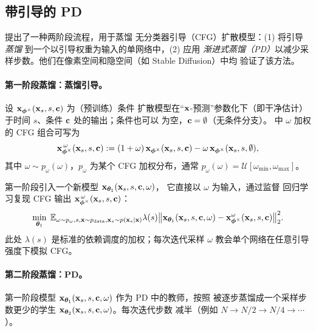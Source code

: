 


\subsection{带引导的 PD}\label{subsec:pd-guidance}
\citet{meng2023distillation} 提出了一种两阶段流程，用于蒸馏
无分类器引导（CFG）扩散模型：(1) 将引导\emph{蒸馏}
到一个以引导权重为输入的单网络中，(2) 应用
\emph{渐进式蒸馏（PD）}以减少采样步数。他们在像素空间和隐空间（如 Stable Diffusion）中均
验证了该方法。

\paragraph{第一阶段蒸馏：蒸馏引导。}
设 ${\mathbf{x}}_{\bm{\phi}^\times}({\mathbf{x}}_s, s, {\mathbf{c}})$ 为（预训练）条件
扩散模型在“${\mathbf{x}}$-预测”参数化下（即干净估计）于时间 $s$、条件 ${\mathbf{c}}$ 处的输出；条件也可以
为空，${\mathbf{c}}=\emptyset$（无条件分支）。 中 $\omega$ 加权的 CFG
组合可写为
\begin{equation}\label{eq:cfg-model-clean}
   {\mathbf{x}}_{\bm{\phi}^\times}^{\,\omega}({\mathbf{x}}_s, s, {\mathbf{c}})
   := (1+\omega)\,{\mathbf{x}}_{\bm{\phi}^\times}({\mathbf{x}}_s, s, {\mathbf{c}})
      - \omega\,{\mathbf{x}}_{\bm{\phi}^\times}({\mathbf{x}}_s, s, \emptyset),
\end{equation}
其中 $\omega \sim p_\omega(\omega)$，$p_\omega$ 为某个 CFG 加权分布，通常 $p_\omega(\omega)=\mathcal{U}[\omega_{\min},\omega_{\max}]$。

第一阶段引入一个新模型 ${\mathbf{x}}_{\bm{\theta}_1}({\mathbf{x}}_s, s, {\mathbf{c}}, \omega)$，
它直接以 $\omega$ 为输入，通过监督
回归学习复现 CFG 输出 ${\mathbf{x}}_{\bm{\phi}^\times}^{\,\omega}({\mathbf{x}}_s, s, {\mathbf{c}})$：
\[
\min_{\bm{\theta}_1}\;
\mathbb{E}_{\omega\sim p_\omega, s, {\mathbf{x}}\sim p_{\mathrm{data}}, {\mathbf{x}}_s \sim p({\mathbf{x}}_s\mid {\mathbf{x}})}
\lambda(s)
\big\|{\mathbf{x}}_{\bm{\theta}_1}({\mathbf{x}}_s, s, {\mathbf{c}}, \omega)-{\mathbf{x}}_{\bm{\phi}^\times}^{\omega}({\mathbf{x}}_s, s, {\mathbf{c}})\big\|_2^2.
\]
此处 $\lambda(s)$ 是标准的依赖调度的加权；每次迭代采样 $\omega$
教会单个网络在任意引导强度下模拟 CFG。

\paragraph{第二阶段蒸馏：PD。}
第一阶段模型 ${\mathbf{x}}_{\bm{\theta}_1}({\mathbf{x}}_s, s, {\mathbf{c}}, \omega)$ 作为
PD 中的教师，按照  被逐步蒸馏成一个采样步数更少的学生
${\mathbf{x}}_{\bm{\theta}_2}({\mathbf{x}}_s, s, {\mathbf{c}}, \omega)$。每次迭代步数
减半（例如 $N \to N/2 \to N/4 \to \cdots$）。

